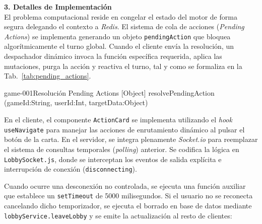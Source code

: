 \textbf{3. Detalles de Implementación} \\
El problema computacional reside en congelar el estado del motor de forma segura delegando el contexto a \textit{Redis}. El sistema de cola de acciones (\textit{Pending Actions}) se implementa generando un objeto \texttt{pendingAction} que bloquea algorítmicamente el turno global. Cuando el cliente envía la resolución, un despachador dinámico invoca la función específica requerida, aplica las mutaciones, purga la acción y reactiva el turno, tal y como se formaliza en la Tab.~\ref{tab:pending_actions}.

\begin{table}[htbp]
\centering
\begin{asigResponsabilidad}{game-001}{Resolución Pending Actions}
{[Object] resolvePendingAction (gameId:String, userId:Int, targetData:Object)}
\end{asigResponsabilidad}
\caption{Descripción algorítmica de la resolución de acciones asíncronas en el servidor. \label{tab:pending_actions}}
\end{table}

En el cliente, el componente \texttt{ActionCard} se implementa utilizando el \textit{hook} \texttt{useNavigate} para manejar las acciones de enrutamiento dinámico al pulsar el botón de la carta. En el servidor, se integra plenamente \textit{Socket.io} para reemplazar el sistema de consultas temporales (\textit{polling}) anterior. Se codifica la lógica en \texttt{LobbySocket.js}, donde se interceptan los eventos de salida explícita e interrupción de conexión (\texttt{disconnecting}). 

Cuando ocurre una desconexión no controlada, se ejecuta una función auxiliar que establece un \texttt{setTimeout} de 5000 milisegundos. Si el usuario no se reconecta cancelando dicho temporizador, se ejecuta el borrado en base de datos mediante \texttt{lobbyService.leaveLobby} y se emite la actualización al resto de clientes:

